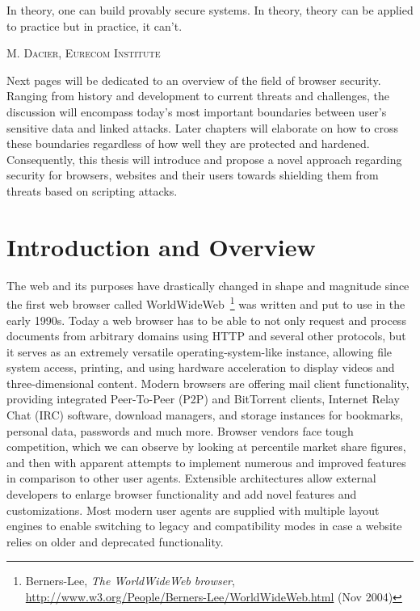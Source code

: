 \epigraph{In theory, one can build provably secure systems. In theory, theory can be applied to practice but in practice, it can't.}%
{\textsc{M. Dacier, Eurecom Institute}}


\label{sec:2.browser_security}

  Next pages will be dedicated to an overview of the field of browser security. Ranging from history and development to current threats and challenges, the discussion will encompass today's most important boundaries between user's sensitive data and linked attacks. Later chapters will elaborate on how to cross these boundaries regardless of how well they are protected and hardened. Consequently, this thesis will introduce and propose a novel approach regarding security for browsers, websites and their users towards shielding them from threats based on scripting attacks.

  \section{Introduction and Overview}
  \label{subsec:2.1.introduction_and_overview_bro_sec}

  The web and its purposes have drastically changed in shape and magnitude since the first web browser called WorldWideWeb~\footnote{Berners-Lee, \textit{The WorldWideWeb browser}, \url{http://www.w3.org/People/Berners-Lee/WorldWideWeb.html} (Nov 2004)} was written and put to use in the early 1990s. Today a web browser has to be able to not only request and process documents from arbitrary domains using HTTP and several other protocols, but it serves as an extremely versatile operating-system-like instance, allowing file system access, printing, and using hardware acceleration to display videos and three-dimensional content. Modern browsers are offering mail client functionality, providing integrated Peer-To-Peer (P2P) and BitTorrent clients, Internet Relay Chat (IRC) software, download managers, and storage instances for bookmarks, personal data, passwords and much more. Browser vendors face tough competition, which we can observe by looking at percentile market share figures, and then  with apparent 
attempts to implement numerous and improved features in comparison to other user agents. Extensible architectures allow external developers to enlarge browser functionality and add novel features and customizations. Most modern user agents are supplied with multiple layout engines to enable switching to legacy and compatibility modes in case a website relies on older and deprecated functionality. \\

